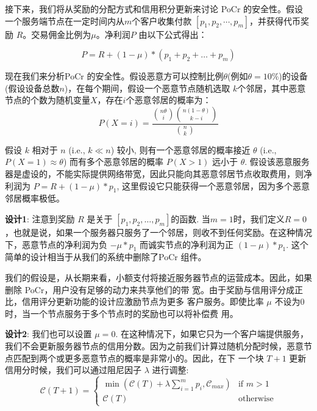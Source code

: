 \documentclass[a4paper]{article}
\begin{document}
接下来，我们将从奖励的分配方式和信用积分更新来讨论 PoCr 的安全性。假设
一个服务端节点在一定时间内从$m$个客户收集付款 $[p_1, p_2,\cdots,p_m]$，并获得代币奖励 $R$。交易佣金比例为$\mu$。净利润$P$ 由以下公式得出：

\begin{equation}
    P = R + (1-\mu)*(p_1+p_2+\ldots+p_m)
\end{equation}

现在我们来分析PoCr 的安全性。假设恶意方可以控制比例$\theta$(例如$\theta=10\%$)的设备(假设设备总数$n$)，在每个期间，假设一个恶意节点随机选取 $k$个邻居，其中恶意节点的个数为随机变量$X$，存在$i$个恶意邻居的概率为：
\begin{equation}
    P(X=i) = \frac{\binom{n\theta}{i} \binom{n(1-\theta)}{k-i}}{\binom{n}{k}}
\end{equation}

假设 $k$ 相对于 $n$ (i.e., $k \ll n$) 较小, 则有一个恶意邻居的概率接近 $\theta$ (i.e., $P(X=1) \approx \theta$) 而有多个恶意邻居的概率 $P(X>1)$ 远小于 $\theta$. 假设该恶意服务器是虚设的，不能实际提供网络带宽，因此只能向其恶意邻居节点收取费用，则净利润为 $P = R + (1-\mu)*p_1$, 这里假设它只能获得一个恶意邻居，因为多个恶意邻居概率极低。

\textbf{设计1}: 注意到奖励 $R$ 是关于 $[p_1,p_2,\ldots,p_m]$的函数.  当$m=1$时，我们定义$R=0$，也就是说，如果一个服务器只服务了一个邻居，则收不到任何奖励。在这种情况下，恶意节点的净利润为负 $-\mu*p_1$ 而诚实节点的净利润为正 $(1-\mu)*p_1$. 这个简单的设计相当于从我们的系统中删除了PoCr 组件。

我们的假设是，从长期来看，小额支付将接近服务器节点的运营成本。因此，如果删除 PoCr，用户没有足够的动力来共享他们的带 宽。由于奖励与信用评分成正比，信用评分更新功能的设计应激励节点为更多
客户服务。即使比率 $\mu$ 不设为0时，当一个节点服务于多个节点时的奖励也可以将补偿费
用。

\textbf{设计2}: 我们也可以设置 $\mu = 0$. 在这种情况下，如果它只为一个客户端提供服务，我们不会更新服务器节点的信用分数。因为之前我们计算过随机分配时候，恶意节点匹配到两个或更多恶意节点的概率是非常小的。因此，在下
一个块 $T+1$ 更新信用分时候，我们可以通过阻尼因子  $\lambda$ 进行调整:
\begin{equation}
    \mathcal{C}(T+1) = \left\{ \begin{array}{ll}
	\min(\mathcal{C}(T) + \lambda \sum_{i=1}^{m} p_i, \mathcal{C}_{max}) & \mbox{if $m>1$} \\
	\mathcal{C}(T)& \mbox{otherwise}
	\end{array} \right.
\end{equation}
\end{document}
